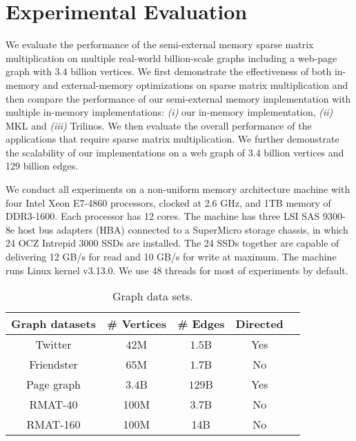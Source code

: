 \section{Experimental Evaluation}

We evaluate the performance of the semi-external memory sparse matrix
multiplication on multiple real-world billion-scale graphs including a web-page
graph with 3.4 billion vertices. We first demonstrate the effectiveness of
both in-memory and external-memory optimizations on sparse matrix multiplication
and then compare the performance of our semi-external memory implementation with
multiple in-memory implementations: \textit{(i)} our in-memory implementation,
\textit{(ii)} MKL and \textit{(iii)} Trilinos. We then evaluate the overall
performance of the applications that require sparse matrix multiplication.
We further demonstrate the scalability of our implementations on a web graph
of 3.4 billion vertices and 129 billion edges.

We conduct all experiments on a non-uniform memory architecture machine with
four Intel Xeon E7-4860 processors, clocked at 2.6 GHz, and 1TB memory of
DDR3-1600. Each processor has 12 cores. The machine has three LSI SAS 9300-8e
host bus adapters (HBA) connected to a SuperMicro storage chassis, in which
24 OCZ Intrepid 3000 SSDs are installed. The 24 SSDs together are capable of
delivering 12 GB/s for read and 10 GB/s for write at maximum. The machine runs
Linux kernel v3.13.0. We use 48 threads for most of experiments by default.

\begin{table}
\begin{center}
\footnotesize
\begin{tabular}{|c|c|c|c|c|}
\hline
Graph datasets & \# Vertices & \# Edges & Directed \\
\hline
Twitter \cite{twitter} & $42$M & $1.5$B & Yes \\
\hline
Friendster \cite{friendster} & $65$M & $1.7$B & No \\
\hline
Page graph \cite{web_graph} & $3.4$B & $129$B & Yes \\
\hline
RMAT-40 \cite{rmat} & 100M & 3.7B & No \\
\hline
RMAT-160 \cite{rmat} & 100M & 14B & No \\
\hline
\end{tabular}
\normalsize
\end{center}
\caption{Graph data sets.}
\label{graphs}
\end{table}

